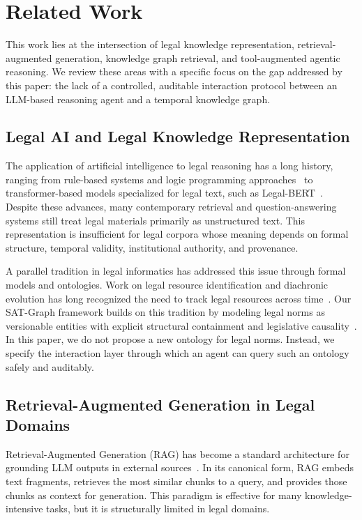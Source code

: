 \documentclass[11pt]{article}
\begin{document}
\section{Related Work}
\label{sec:related_work}

This work lies at the intersection of legal knowledge representation, retrieval-augmented generation, knowledge graph retrieval, and tool-augmented agentic reasoning. We review these areas with a specific focus on the gap addressed by this paper: the lack of a controlled, auditable interaction protocol between an LLM-based reasoning agent and a temporal knowledge graph.

\subsection{Legal AI and Legal Knowledge Representation}

The application of artificial intelligence to legal reasoning has a long history, ranging from rule-based systems and logic programming approaches~\cite{sergot1986logic} to transformer-based models specialized for legal text, such as Legal-BERT~\cite{chalkidis2020legalbert}. Despite these advances, many contemporary retrieval and question-answering systems still treat legal materials primarily as unstructured text. This representation is insufficient for legal corpora whose meaning depends on formal structure, temporal validity, institutional authority, and provenance.

A parallel tradition in legal informatics has addressed this issue through formal models and ontologies. Work on legal resource identification and diachronic evolution has long recognized the need to track legal resources across time~\cite{lima2008ontology}. Our SAT-Graph framework builds on this tradition by modeling legal norms as versionable entities with explicit structural containment and legislative causality~\cite{demartim2025graphrag,demartim2025temporal}. In this paper, we do not propose a new ontology for legal norms. Instead, we specify the interaction layer through which an agent can query such an ontology safely and auditably.

\subsection{Retrieval-Augmented Generation in Legal Domains}

Retrieval-Augmented Generation (RAG) has become a standard architecture for grounding LLM outputs in external sources~\cite{lewis2020retrieval}. In its canonical form, RAG embeds text fragments, retrieves the most similar chunks to a query, and provides those chunks as context for generation. This paradigm is effective for many knowledge-intensive tasks, but it is structurally limited in legal domains.
\end{document}
